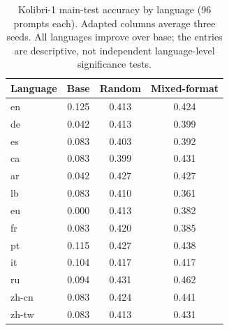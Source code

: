 \begin{table}[tbp]
\caption{Kolibri-1 main-test accuracy by language (96 prompts each). Adapted columns average three seeds. All languages improve over base; the entries are descriptive, not independent language-level significance tests.}\label{t:kolibri-languages}
\centering\footnotesize\setlength{\tabcolsep}{7pt}
\begin{tabular}{lccc}\toprule
Language & Base & Random & Mixed-format\\\midrule
en & 0.125 & 0.413 & 0.424\\
de & 0.042 & 0.413 & 0.399\\
es & 0.083 & 0.403 & 0.392\\
ca & 0.083 & 0.399 & 0.431\\
ar & 0.042 & 0.427 & 0.427\\
lb & 0.083 & 0.410 & 0.361\\
eu & 0.000 & 0.413 & 0.382\\
fr & 0.083 & 0.420 & 0.385\\
pt & 0.115 & 0.427 & 0.438\\
it & 0.104 & 0.417 & 0.417\\
ru & 0.094 & 0.431 & 0.462\\
zh-cn & 0.083 & 0.424 & 0.441\\
zh-tw & 0.083 & 0.413 & 0.431\\
\bottomrule\end{tabular}
\end{table}
